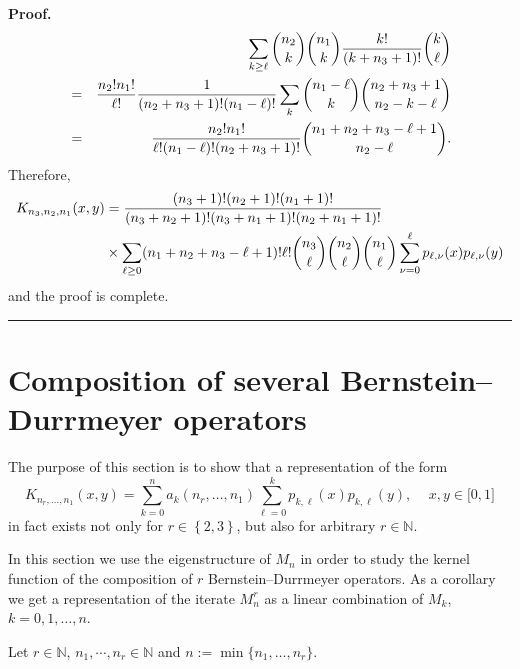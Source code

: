 \documentclass[12pt,reqno]{article}
\newenvironment{proof}[1][Proof]{\noindent\textbf{#1.} }{\ \rule{0.5em}{0.5em}}
\begin{document}
\begin{proof}
\begin{eqnarray*}
&&\sum_{k\geq \ell }{\binom{n_{2}}{k}}{\binom{n_{1}}{k}}\dfrac{k!}{%
(k+n_{3}+1)!}{\binom{k}{\ell }} \\
&=&\dfrac{n_{2}!n_{1}!}{\ell !}\dfrac{1}{(n_{2}+n_{3}+1)!(n_{1}-\ell )!}%
\sum_{k}{\binom{n_{1}-\ell }{k}}{\binom{n_{2}+n_{3}+1}{n_{2}-k-\ell }} \\
&=&\dfrac{n_{2}!n_{1}!}{\ell !(n_{1}-\ell )!(n_{2}+n_{3}+1)!}{\binom{%
n_{1}+n_{2}+n_{3}-\ell +1}{n_{2}-\ell }}.
\end{eqnarray*}%
Therefore, 
\begin{align*}
K_{n_{3},n_{2},n_{1}}(x,y)& =\dfrac{(n_{3}+1)!(n_{2}+1)!(n_{1}+1)!}{%
(n_{3}+n_{2}+1)!(n_{3}+n_{1}+1)!(n_{2}+n_{1}+1)!} \\
& \times \sum_{\ell \geq 0}(n_{1}+n_{2}+n_{3}-\ell +1)!\ell !{\binom{n_{3}}{%
\ell }}{\binom{n_{2}}{\ell }}{\binom{n_{1}}{\ell }}\sum_{\nu =0}^{\ell
}p_{\ell ,\nu }(x)p_{\ell ,\nu }(y)
\end{align*}%
and the proof is complete.
\end{proof}

\section{Composition of several Bernstein--Durrmeyer operators}

\label{sec3}

The purpose of this section is to show that a representation of the form 
\begin{equation*}
K_{n_{r},\ldots ,n_{1}}\left( x,y\right) =\displaystyle \sum_{k=0}^{n}a_{k}%
\left( n_{r},\ldots ,n_{1}\right) \sum_{\ell =0}^{k}p_{k,\ell }(x)p_{k,\ell
}(y),\, \quad x,y\in \lbrack 0,1]
\end{equation*}%
in fact exists not only for $r\in \left \{ 2,3\right \} $, but also for
arbitrary $r\in \mathbb{N}$.

In this section we use the eigenstructure of $M_n$ in order to study the
kernel function of the composition of $r$ Bernstein--Durrmeyer operators. As
a corollary we get a representation of the iterate $M_n^r$ as a linear
combination of $M_k$, $k=0,1,\dots,n$.

Let $r\in {\mathbb{N}}$, $n_1,\cdots, n_r\in {\mathbb{N}}$ and $n:=\min
\{n_1,\dots,n_r\}$.
\end{document}
